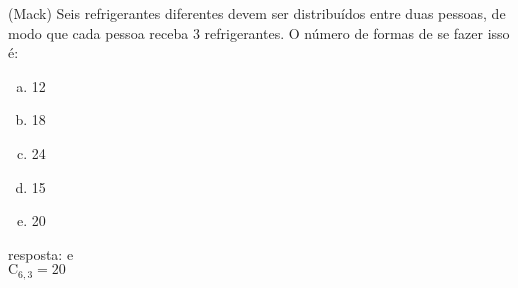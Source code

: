 \begin{ex}
 (Mack) Seis refrigerantes diferentes devem ser distribuídos entre duas pessoas, de modo que cada pessoa receba 3 refrigerantes. O número de formas de se fazer isso é:
    \begin{enumerate}[(a)]
    \item 12
    \item 18
    \item 24
    \item 15
    \item 20
    \end{enumerate}
      \begin{sol}
       resposta: e \\
       $\mathrm{C}_{6,3}=20$
      \end{sol}
\end{ex}